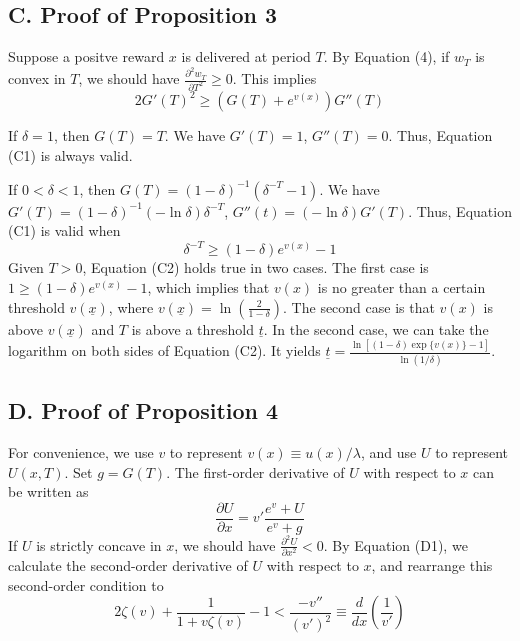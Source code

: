 \hypertarget{c.-proof-of-proposition-3}{%
\subsection*{C. Proof of Proposition
3}\label{c.-proof-of-proposition-3}}

Suppose a positve reward \(x\) is delivered at period \(T\). By Equation
(4), if \(w_T\) is convex in \(T\), we should have
\(\frac{\partial^2 w_T}{\partial T^2}\geq 0\). This
implies\[\tag{C1} 2G'(T)^2\geq(G(T)+e^{v(x)})G''(T) \]

If \(\delta=1\), then \(G(T)=T\). We have \(G'(T)=1\), \(G''(T)=0\).
Thus, Equation (C1) is always valid.

If \(0<\delta<1\), then \(G(T)=(1-\delta)^{-1}(\delta^{-T}-1)\). We have
\(G'(T)=(1-\delta)^{-1}(-\ln\delta)\delta^{-T}\),
\(G''(t)=(-\ln\delta)G'(T)\). Thus, Equation (C1) is valid when
\[\tag{C2} \delta^{-T}\geq(1-\delta)e^{v(x)}-1 \]Given \(T>0\), Equation
(C2) holds true in two cases. The first case is
\(1\geq (1-\delta)e^{v(x)}-1\), which implies that \(v(x)\) is no
greater than a certain threshold \(v(\underline{x})\), where
\(v(\underline{x})=\ln(\frac{2}{1-\delta})\). The second case is that
\(v(x)\) is above \(v(\underline{x})\) and \(T\) is above a threshold
\(\underline{t}\). In the second case, we can take the logarithm on both
sides of Equation (C2). It yields
\(\underline{t}=\frac{\ln[(1-\delta)\exp\{v(x)\}-1]}{\ln(1/\delta)}\).

\hypertarget{d.-proof-of-proposition-4}{%
\subsection*{D. Proof of Proposition
4}\label{d.-proof-of-proposition-4}}

For convenience, we use \(v\) to represent \(v(x)\equiv u(x)/\lambda\),
and use \(U\) to represent \(U(x,T)\). Set \(g= G(T)\). The first-order
derivative of \(U\) with respect to \(x\) can be written as\[\tag{D1}
\frac{\partial U}{\partial x}=v'\frac{e^v+U}{e^v+g}
\]If \(U\) is strictly concave in \(x\), we should have
\(\frac{\partial^2 U}{\partial x^2}<0\). By Equation (D1), we calculate
the second-order derivative of \(U\) with respect to \(x\), and
rearrange this second-order condition to\[\tag{D2}
2\zeta(v)+\frac{1}{1+v\zeta(v)}-1<\frac{-v''}{(v')^2}\equiv\frac{d}{dx}\left(\frac{1}{v'}\right)
\]

